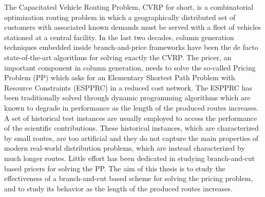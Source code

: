 \noindent The Capacitated Vehicle Routing Problem, CVRP for short,
is a combinatorial optimization routing problem in which
a geographically distributed set of
customers with associated known demands must be served with a fleet of vehicles
stationed at a central facility.
In the last two decades,
column generation techniques embedded inside branch-and-price frameworks
have been the de facto state-of-the-art algorithms
for solving exactly the CVRP.
The pricer, an important component in column generation, needs to solve
the so-called Pricing Problem (PP) which asks for an
Elementary Shortest Path Problem with Resource Constraints (ESPPRC)
in a reduced cost network.
The ESPPRC has been traditionally solved through dynamic programming
algorithms which are known to degrade in performance as
the length of the produced routes increases.
A set of historical test instances are usually employed to access
the performance of the scientific contributions.
These historical instances,
which are characterized by small routes,
are too artificial
and they do not capture the main properties of modern real-world distribution
problems,
which are instead characterized by much longer routes.
Little effort has been dedicated in studying branch-and-cut
based pricers for solving the PP.
The aim of this thesis is to study the effectiveness
of a branch-and-cut based scheme for solving the pricing problem,
and to study its behavior as the length of the produced routes increases.
